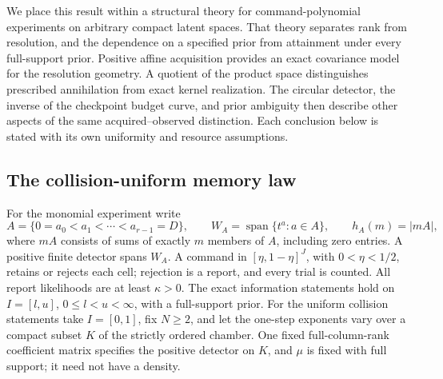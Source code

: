 \documentclass[11pt]{amsart}
\theoremstyle{definition}\newtheorem{definition}[theorem]{Definition}
\theoremstyle{remark}\newtheorem{remark}[theorem]{Remark}
\begin{document}
We place this result within a structural theory for command-polynomial
experiments on arbitrary compact latent spaces. That theory separates
rank from resolution, and the dependence on a specified prior from
attainment under every full-support prior. Positive affine acquisition
provides an exact covariance model for the resolution geometry. A
quotient of the product space distinguishes prescribed annihilation
from exact kernel realization. The circular detector, the inverse of
the checkpoint budget curve, and prior ambiguity then describe other
aspects of the same acquired--observed distinction. Each conclusion
below is stated with its own uniformity and resource assumptions.

\subsection{The collision-uniform memory law}

For the monomial experiment write
\[
 A=\{0=a_0<a_1<\cdots<a_{r-1}=D\},\qquad
 W_A=\operatorname{span}\{t^a:a\in A\},\qquad h_A(m)=|mA|,
\]
where $mA$ consists of sums of exactly $m$ members of $A$, including
zero entries. A positive finite detector spans $W_A$. A command in
$[\eta,1-\eta]^J$, with $0<\eta<1/2$, retains or rejects each cell;
rejection is a report, and every trial is counted. All report
likelihoods are at least $\kappa>0$. The exact information statements
hold on $I=[l,u]$, $0\le l<u<\infty$, with a full-support prior.
For the uniform collision statements take $I=[0,1]$, fix $N\ge2$,
and let the one-step exponents vary over a compact subset $K$ of the
strictly ordered chamber. One fixed full-column-rank coefficient matrix
specifies the positive detector on $K$, and $\mu$ is fixed with full
support; it need not have a density.
\end{document}
